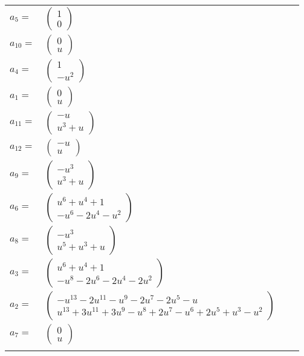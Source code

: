 \documentclass[1p]{elsarticle_modified}
\theoremstyle{definition}
\begin{document}
\begin{tabular}{m{7pt} m{180pt} m{7pt} m{180pt} }
\flushright $a_{5}=$&$\begin{pmatrix}1\\0\end{pmatrix}$ \\
\flushright $a_{10}=$&$\begin{pmatrix}0\\u\end{pmatrix}$ \\
\flushright $a_{4}=$&$\begin{pmatrix}1\\- u^2\end{pmatrix}$ \\
\flushright $a_{1}=$&$\begin{pmatrix}0\\u\end{pmatrix}$ \\
\flushright $a_{11}=$&$\begin{pmatrix}- u\\u^3+u\end{pmatrix}$ \\
\flushright $a_{12}=$&$\begin{pmatrix}- u\\u\end{pmatrix}$ \\
\flushright $a_{9}=$&$\begin{pmatrix}- u^3\\u^3+u\end{pmatrix}$ \\
\flushright $a_{6}=$&$\begin{pmatrix}u^6+u^4+1\\- u^6-2 u^4- u^2\end{pmatrix}$ \\
\flushright $a_{8}=$&$\begin{pmatrix}- u^3\\u^5+u^3+u\end{pmatrix}$ \\
\flushright $a_{3}=$&$\begin{pmatrix}u^6+u^4+1\\- u^8-2 u^6-2 u^4-2 u^2\end{pmatrix}$ \\
\flushright $a_{2}=$&$\begin{pmatrix}- u^{13}-2 u^{11}- u^9-2 u^7-2 u^5- u\\u^{13}+3 u^{11}+3 u^9- u^8+2 u^7- u^6+2 u^5+u^3- u^2\end{pmatrix}$ \\
\flushright $a_{7}=$&$\begin{pmatrix}0\\u\end{pmatrix}$\\&\end{tabular}
\end{document}
